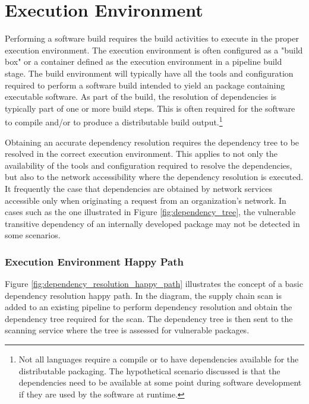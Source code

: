 
\section{Execution Environment}\label{sec:execution_environment}

Performing a software build requires the build activities to execute in the
proper execution environment.  The execution environment is often configured
as a "build box" or a container defined as the execution environment in
a pipeline build stage.  The build environment will typically have all the
tools and configuration required to perform a software build intended 
to yield an package 
containing executable software.  As part of the build, the resolution of 
dependencies is typically part of one or more build steps.  This is often 
required for the software to compile and/or to produce
a distributable build output.\footnote{Not all languages require a compile
or to have dependencies available for the distributable packaging.
The hypothetical scenario discussed is that the dependencies need to be
available at some point during software development if they are 
used by the software at runtime.}

Obtaining an accurate dependency resolution requires the dependency tree to be
resolved in the correct execution environment.  This applies to not only the
availability of the tools and configuration required to resolve 
the dependencies, but also to
the network accessibility where the dependency resolution is executed.  It
frequently the case that dependencies are obtained by network services
accessible only when originating a request from an organization's network. 
In cases such as the one illustrated in Figure \ref{fig:dependency_tree},
the vulnerable transitive dependency of an internally developed package may
not be detected in some scenarios.



\subsubsection{Execution Environment Happy Path}\label{sssec:happy_path}

Figure \ref{fig:dependency_resolution_happy_path} illustrates the concept
of a basic dependency resolution happy path.  In the diagram, the supply chain
scan is added to an existing pipeline to perform dependency resolution
and obtain the dependency tree required for the scan.  The dependency tree is
then sent to the scanning service where the tree is assessed for 
vulnerable packages.

